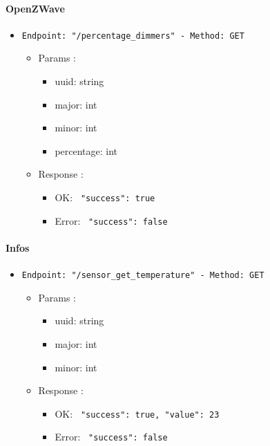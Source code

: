 \paragraph{OpenZWave}

\begin{itemize}
  \item \texttt{Endpoint: "/percentage_dimmers" -  Method: GET}
  \begin{itemize} 
    \item Params :
    \begin{itemize}
      \item uuid: string
      \item major: int
      \item minor: int
      \item percentage: int
    \end{itemize}

    \item Response : 
    \begin{itemize}
      \item OK: \texttt{{ "success": true }}
      \item Error: \texttt{{ "success": false }}
    \end{itemize}
  \end{itemize}
\end{itemize}

\paragraph{Infos}

\begin{itemize}
  \item \texttt{Endpoint: "/sensor_get_temperature" -  Method: GET}
  \begin{itemize} 
    \item Params :
    \begin{itemize}
      \item uuid: string
      \item major: int
      \item minor: int
    \end{itemize}

    \item Response : 
    \begin{itemize}
      \item OK: \texttt{{ "success": true, "value": 23 }}
      \item Error: \texttt{{ "success": false }}
    \end{itemize}
  \end{itemize}
\end{itemize}


